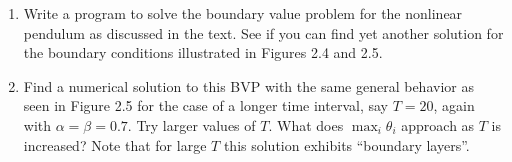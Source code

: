 

\begin{enumerate} 

\item Write a program to solve the boundary value problem for the
nonlinear pendulum as discussed in the text.  See if you can find yet
another solution for the boundary conditions illustrated in Figures 2.4
and 2.5.

\item Find a numerical solution to this BVP with the same
general behavior as seen in Figure 2.5 for the case of a longer time
interval, say $T=20$, again with $\alpha=\beta=0.7$.  Try larger values of
$T$.  What does $\max_i \theta_i$ approach as $T$ is increased?  Note that
for large $T$ this solution  exhibits ``boundary layers''.

\end{enumerate} 

